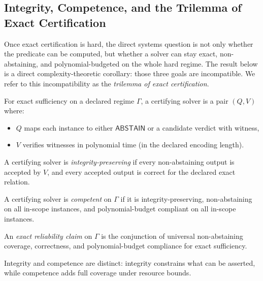 \subsection{Integrity, Competence, and the Trilemma of Exact Certification}\label{sec:integrity-competence}

Once exact certification is hard, the direct systems question is not only whether the predicate can be computed, but whether a solver can stay exact, non-abstaining, and polynomial-budgeted on the whole hard regime. The result below is a direct complexity-theoretic corollary: those three goals are incompatible. We refer to this incompatibility as the \emph{trilemma of exact certification}.

\begin{definition}
For exact sufficiency on a declared regime $\Gamma$, a certifying solver is a pair $(Q,V)$ where:
\begin{itemize}
\item $Q$ maps each instance to either $\mathsf{ABSTAIN}$ or a candidate verdict with witness,
\item $V$ verifies witnesses in polynomial time (in the declared encoding length).
\end{itemize}
\end{definition}

\begin{definition}[Integrity]
A certifying solver is \emph{integrity-preserving} if every non-abstaining output is accepted by $V$, and every accepted output is correct for the declared exact relation.
\end{definition}

\begin{definition}[Competence]
A certifying solver is \emph{competent} on $\Gamma$ if it is integrity-preserving, non-abstaining on all in-scope instances, and polynomial-budget compliant on all in-scope instances.
\end{definition}

\begin{definition}
An \emph{exact reliability claim} on $\Gamma$ is the conjunction of universal non-abstaining coverage, correctness, and polynomial-budget compliance for exact sufficiency.
\end{definition}

\begin{proposition}
Integrity and competence are distinct: integrity constrains what can be asserted, while competence adds full coverage under resource bounds.
\end{proposition}


